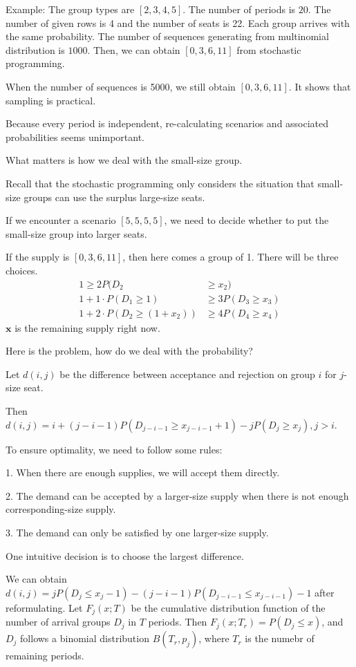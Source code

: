 Example:
The group types are $[2,3,4,5]$. The number of periods is $20$. The number of given rows is 4 and the number of seats is 22.
Each group arrives with the same probability.
The number of sequences generating from multinomial distribution is $1000$. Then, we can obtain $[0,3,6,11]$ from stochastic programming. 

When the number of sequences is 5000, we still obtain $[0,3,6,11]$. It shows that sampling is practical.

Because every period is independent, re-calculating scenarios and associated probabilities seems unimportant.

What matters is how we deal with the small-size group.

Recall that the stochastic programming only considers the situation that small-size groups can use the surplus large-size seats.

If we encounter a scenario $[5,5,5,5]$, we need to decide whether to put the small-size group into larger seats.

If the supply is $[0,3,6,11]$, then here comes a group of 1. There will be three choices.
\begin{align*}
1 \geq 2 P(D_{2} & \geq x_{2}) \\
1 + 1\cdot P(D_{1}\geq 1) & \geq 3 P(D_{3}\geq x_{3}) \\
1 + 2\cdot P(D_{2}\geq (1+ x_{2})) & \geq 4 P(D_{4}\geq x_{4})
\end{align*}
$\mathbf{x}$ is the remaining supply right now.

Here is the problem, how do we deal with the probability?

Let $d(i,j)$ be the difference between acceptance and rejection on group $i$ for $j$-size seat.

Then $d(i,j) = i + (j-i-1)P(D_{j-i-1} \geq x_{j-i-1}+1) - j P(D_{j} \geq x_{j}), j >i$.

To ensure optimality, we need to follow some rules:

1. When there are enough supplies, we will accept them directly.

2. The demand can be accepted by a larger-size supply when there is not enough corresponding-size supply. 

3. The demand can only be satisfied by one larger-size supply.

One intuitive decision is to choose the largest difference.

We can obtain $d(i,j) = j P(D_{j} \leq x_{j} -1) - (j-i-1)P(D_{j-i-1} \leq x_{j-i-1}) -1$ after reformulating. 
Let $F_{j}(x;T)$ be the cumulative distribution function of the number of arrival groups $D_{j}$ in $T$ periods. Then $F_{j}(x; T_{r}) = P(D_{j} \leq x)$, and $D_{j}$ follows a binomial distribution $B(T_{r}, p_{j})$, where $T_{r}$ is the numebr of remaining periods.

